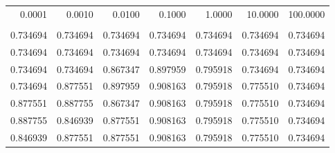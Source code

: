 \begin{tabular}{rrrrrrr}
\toprule
 0.0001   &  0.0010   &  0.0100   &  0.1000   &  1.0000   &  10.0000  &  100.0000 \\
          &           &           &           &           &           &           \\
\midrule
 0.734694 &  0.734694 &  0.734694 &  0.734694 &  0.734694 &  0.734694 &  0.734694 \\
 0.734694 &  0.734694 &  0.734694 &  0.734694 &  0.734694 &  0.734694 &  0.734694 \\
 0.734694 &  0.734694 &  0.867347 &  0.897959 &  0.795918 &  0.734694 &  0.734694 \\
 0.734694 &  0.877551 &  0.897959 &  0.908163 &  0.795918 &  0.775510 &  0.734694 \\
 0.877551 &  0.887755 &  0.867347 &  0.908163 &  0.795918 &  0.775510 &  0.734694 \\
 0.887755 &  0.846939 &  0.877551 &  0.908163 &  0.795918 &  0.775510 &  0.734694 \\
 0.846939 &  0.877551 &  0.877551 &  0.908163 &  0.795918 &  0.775510 &  0.734694 \\
\bottomrule
\end{tabular}
